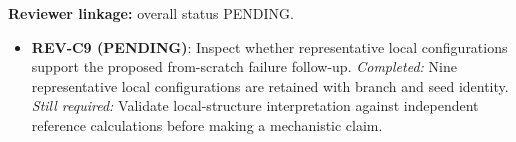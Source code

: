 \textbf{Reviewer linkage:} overall status PENDING.
\begin{itemize}[leftmargin=1.4em,noitemsep]
\item \textbf{REV-C9 (PENDING)}: Inspect whether representative local configurations support the proposed from-scratch failure follow-up. \emph{Completed:} Nine representative local configurations are retained with branch and seed identity. \emph{Still required:} Validate local-structure interpretation against independent reference calculations before making a mechanistic claim.
\end{itemize}
